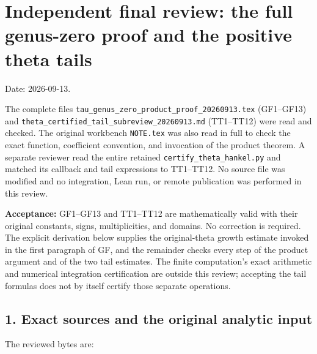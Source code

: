 \section{Independent final review: the full genus-zero proof and the positive theta tails}\label{C47stage:GFR:independent-final-review-the-full-genus-zero-proof-and-the-positive-theta-tails}

Date: 2026-09-13.

The complete files \nolinkurl{tau_genus_zero_product_proof_20260913.tex} (GF1--GF13) and \nolinkurl{theta_certified_tail_subreview_20260913.md} (TT1--TT12) were read and checked. The original workbench \nolinkurl{NOTE.tex} was also read in full to check the exact function, coefficient convention, and invocation of the product theorem. A separate reviewer read the entire retained \nolinkurl{certify_theta_hankel.py} and matched its callback and tail expressions to TT1--TT12. No source file was modified and no integration, Lean run, or remote publication was performed in this review.

\textbf{Acceptance:} GF1--GF13 and TT1--TT12 are mathematically valid with their original constants, signs, multiplicities, and domains. No correction is required. The explicit derivation below supplies the original-theta growth estimate invoked in the first paragraph of GF, and the remainder checks every step of the product argument and of the two tail estimates. The finite computation's exact arithmetic and numerical integration certification are outside this review; accepting the tail formulas does not by itself certify those separate operations.

\subsection{1. Exact sources and the original analytic input}\label{C47stage:GFR:exact-sources-and-the-original-analytic-input}

The reviewed bytes are:


